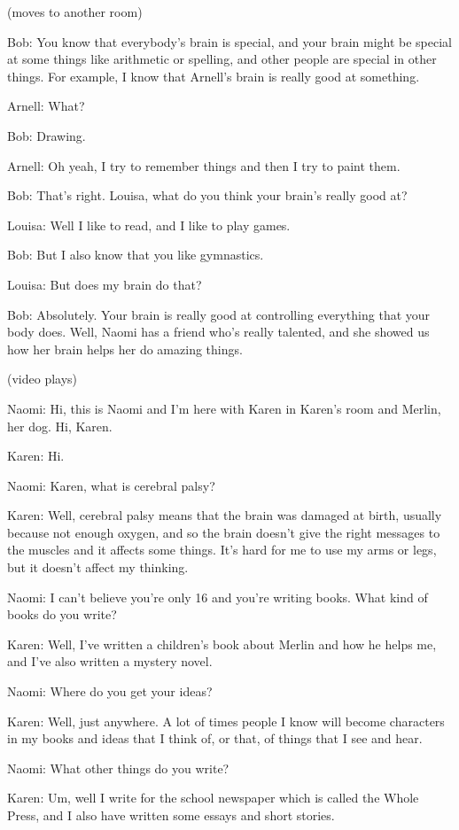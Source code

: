 (moves to another room)

Bob: You know that everybody's brain is special, and your brain might be special at some things like arithmetic or spelling, and other people are special in other things. For example, I know that Arnell's brain is really good at something.

Arnell: What?

Bob: Drawing.

Arnell: Oh yeah, I try to remember things and then I try to paint them.

Bob: That's right. Louisa, what do you think your brain's really good at?

Louisa: Well I like to read, and I like to play games.

Bob: But I also know that you like gymnastics.

Louisa: But does my brain do that?

Bob: Absolutely. Your brain is really good at controlling everything that your body does. Well, Naomi has a friend who's really talented, and she showed us how her brain helps her do amazing things.

(video plays)

Naomi: Hi, this is Naomi and I'm here with Karen in Karen's room and Merlin, her dog. Hi, Karen.

Karen: Hi.

Naomi: Karen, what is cerebral palsy?

Karen: Well, cerebral palsy means that the brain was damaged at birth, usually because not enough oxygen, and so the brain doesn't give the right messages to the muscles and it affects some things. It's hard for me to use my arms or legs, but it doesn't affect my thinking.

Naomi: I can't believe you're only 16 and you're writing books. What kind of books do you write?

Karen: Well, I've written a children's book about Merlin and how he helps me, and I've also written a mystery novel.

Naomi: Where do you get your ideas?

Karen: Well, just anywhere. A lot of times people I know will become characters in my books and ideas that I think of, or that, of things that I see and hear.

Naomi: What other things do you write?

Karen: Um, well I write for the school newspaper which is called the Whole Press, and I also have written some essays and short stories.

